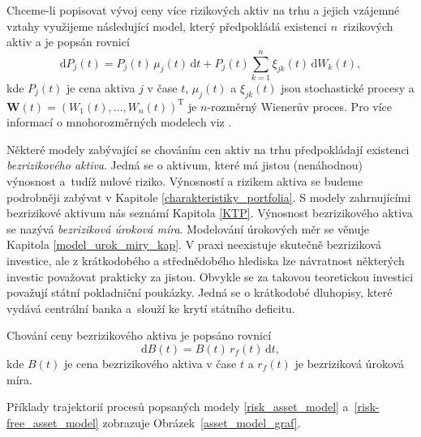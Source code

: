\documentclass[a4paper,12pt]{report}
\theoremstyle{definition} \newtheorem{definice}[veta]{Definice}
\theoremstyle{remark}
\begin{document}
Chceme-li popisovat vývoj ceny více rizikových aktiv na trhu a jejich vzájemné vztahy využijeme následující model, který předpokládá existenci $n$~rizikových aktiv a je popsán rovnicí
\begin{equation}\label{multi_risk_asset_model}
\mathrm{d}P_j(t)=P_j(t)\,\mu_j(t)\,\mathrm{d}t+P_j(t)\sum_{k=1}^{n}\xi_{jk}(t)\,\mathrm{d}W_k(t),
\end{equation}
kde $P_j(t)$ je cena aktiva $j$ v čase $t$, $\mu_j(t)$ a $\xi_{jk}(t)$ jsou stochastické procesy a $\boldsymbol{W}(t)=(W_1(t),\dots,W_n(t))^\mathrm{T}$ je $n$-rozměrný Wienerův proces. 
Pro více informací o mnohorozměrných modelech viz \cite{etheridge2002course}.

Některé modely zabývající se chováním cen aktiv na trhu předpokládají existenci \textit{bezrizikového aktiva}.
Jedná se o aktivum, které má jistou (nenáhodnou) výnosnost a~tudíž nulové riziko.
Výnosností a rizikem aktiva se budeme podrobněji zabývat v Kapitole \ref{charakteristiky_portfolia}. 
S modely zahrnujícími bezrizikové aktivum nás seznámí Kapitola \ref{KTP}.
Výnosnost bezrizikového aktiva se nazývá \textit{bezriziková úroková míra}.
Modelování úrokových měr se věnuje Kapitola \ref{model_urok_miry_kap}.
V praxi neexistuje skutečně bezriziková investice, ale z krátkodobého a střednědobého hlediska lze návratnost některých investic považovat prakticky za jistou.
Obvykle se za takovou teoretickou investici považují státní pokladniční poukázky.
Jedná se o krátkodobé dluhopisy, které vydává centrální banka a~slouží ke krytí státního deficitu.

Chování ceny bezrizikového aktiva je popsáno rovnicí
\begin{equation}\label{risk-free_asset_model}
\mathrm{d}B(t)=B(t)\,r_f(t)\,\mathrm{d}t,
\end{equation}
kde $B(t)$ je cena bezrizikového aktiva v čase $t$ a $r_f(t)$ je bezriziková úroková míra.

Příklady trajektorií procesů popsaných modely \eqref{risk_asset_model} a~\eqref{risk-free_asset_model} zobrazuje Obrázek~\ref{asset_model_graf}.
\end{document}
